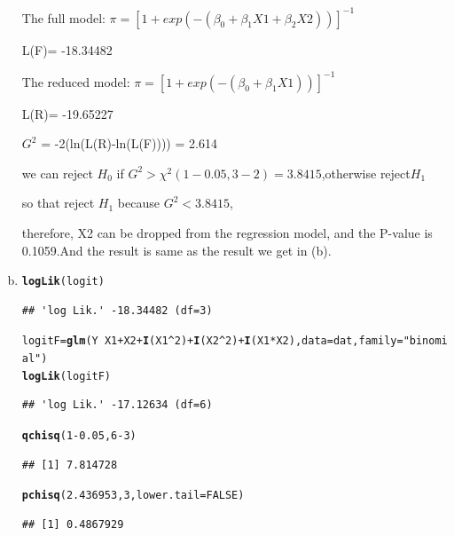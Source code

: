 \documentclass{article}\usepackage[]{graphicx}\usepackage[]{color}
\makeatletter
\newcommand{\hlnum}[1]{\textcolor[rgb]{0.686,0.059,0.569}{#1}}%
\newcommand{\hlstr}[1]{\textcolor[rgb]{0.192,0.494,0.8}{#1}}%
\newcommand{\hlopt}[1]{\textcolor[rgb]{0,0,0}{#1}}%
\newcommand{\hlstd}[1]{\textcolor[rgb]{0.345,0.345,0.345}{#1}}%
\newcommand{\hlkwb}[1]{\textcolor[rgb]{0.69,0.353,0.396}{#1}}%
\newcommand{\hlkwc}[1]{\textcolor[rgb]{0.333,0.667,0.333}{#1}}%
\newcommand{\hlkwd}[1]{\textcolor[rgb]{0.737,0.353,0.396}{\textbf{#1}}}%
\newenvironment{kframe}{%
 \def\at@end@of@kframe{}%
 \ifinner\ifhmode%
  \def\at@end@of@kframe{\end{minipage}}%
  \begin{minipage}{\columnwidth}%
 \fi\fi%
 \def\FrameCommand##1{\hskip\@totalleftmargin \hskip-\fboxsep
 \colorbox{shadecolor}{##1}\hskip-\fboxsep
     \hskip-\linewidth \hskip-\@totalleftmargin \hskip\columnwidth}%
 \MakeFramed {\advance\hsize-\width
   \@totalleftmargin\z@ \linewidth\hsize
   \@setminipage}}%
 {\par\unskip\endMakeFramed%
 \at@end@of@kframe}
\newenvironment{knitrout}{}{} %
\makeatother
\begin{document}
\begin{enumerate}[(a)]
\begin{center}
The full model: $\pi = [1 + exp(-(\beta_0 + \beta_1 X1 + \beta_2 X2))]^{-1} $

L(F)= -18.34482

The reduced model: $\pi = [1 + exp(-(\beta_0 + \beta_1 X1))]^{-1} $

L(R)= -19.65227

$G^2$ = -2(ln(L(R)-ln(L(F)))) = 2.614

we can reject $H_0$ if $G^2 > \chi^2(1-0.05, 3-2)=3.8415$,otherwise reject$H_1$

so that reject $H_1$ because $G^2 <3.8415$,

therefore, X2 can be dropped from the regression model, and the P-value is 0.1059.And the result is same as the result we get in (b).
\end{center}

\item

\begin{knitrout}
\color{fgcolor}\begin{kframe}
\begin{alltt}
  \hlkwd{logLik}\hlstd{(logit)}
\end{alltt}
\begin{verbatim}
## 'log Lik.' -18.34482 (df=3)
\end{verbatim}
\begin{alltt}
  \hlstd{logitF} \hlkwb{=} \hlkwd{glm}\hlstd{(Y} \hlopt{~} \hlstd{X1} \hlopt{+} \hlstd{X2} \hlopt{+}\hlkwd{I}\hlstd{(X1}\hlopt{^}\hlnum{2}\hlstd{)} \hlopt{+} \hlkwd{I}\hlstd{(X2}\hlopt{^}\hlnum{2}\hlstd{)} \hlopt{+} \hlkwd{I}\hlstd{(X1}\hlopt{*}\hlstd{X2),} \hlkwc{data} \hlstd{= dat,} \hlkwc{family} \hlstd{=} \hlstr{"binomial"}\hlstd{)}
  \hlkwd{logLik}\hlstd{(logitF)}
\end{alltt}
\begin{verbatim}
## 'log Lik.' -17.12634 (df=6)
\end{verbatim}
\begin{alltt}
  \hlkwd{qchisq}\hlstd{(}\hlnum{1}\hlopt{-}\hlnum{0.05}\hlstd{,} \hlnum{6}\hlopt{-}\hlnum{3}\hlstd{)}
\end{alltt}
\begin{verbatim}
## [1] 7.814728
\end{verbatim}
\begin{alltt}
  \hlkwd{pchisq}\hlstd{(}\hlnum{2.436953}\hlstd{,} \hlnum{3}\hlstd{,} \hlkwc{lower.tail} \hlstd{=} \hlnum{FALSE}\hlstd{)}
\end{alltt}
\begin{verbatim}
## [1] 0.4867929
\end{verbatim}
\end{kframe}
\end{knitrout}


\end{enumerate}
\end{document}
